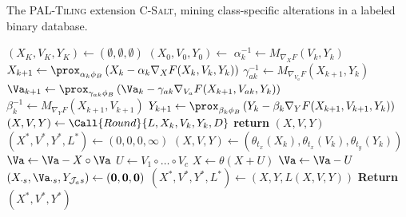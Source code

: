 \begin{algorithm}[t]
\caption{The \textsc{PAL-Tiling} extension \textsc{C-Salt}, mining class-specific alterations in a labeled binary database.}
\begin{algorithmic}[1]
        \State $(X_K,V_K,Y_K)\gets (\emptyset, \emptyset, \emptyset)$
            \State $(X_0,V_0,Y_0) \gets $ 
            \label{alg:csalt:optStart} 
   	        \State $\alpha_k^{-1} \gets M_{\nabla_XF}(V_k,Y_k)$
            \State $X_{k+1} \gets \prox_{\alpha_k\phi_B}\left(X_k-\alpha_k\nabla_XF(X_k,V_k,Y_k)\right)$
            \State $\gamma_{ak}^{-1} \gets M_{\nabla_{V_a}F}(X_{k+1},Y_k)$  
            \State $\Va_{k+1} \gets \prox_{\gamma_{ak}\phi_B}\left(\Va_k-\gamma_{ak}\nabla_{V_a}F(X_{k+1},V_{ak},Y_k)\right)$  
            \State $\beta_k^{-1} \gets M_{\nabla_YF}(X_{k+1},V_{k+1})$
            \State $Y_{k+1} \gets \prox_{\beta_k\phi_B}\left(Y_k-\beta_k\nabla_YF(X_{k+1},V_{k+1},Y_k)\right)$
    \EndFor\label{alg:csalt:optEnd}
    \State $(X,V,Y)\gets \Call{Round}{L,X_k,V_k,Y_k,D}$
    	\textbf{return} $(X,V,Y)$
    \EndIIf\label{alg:csalt:rankgap}
    \EndFor
    \EndFunction
    \Statex ~
    \State $(X^*,V^*,Y^*,L^*)\gets (0,0,0,\infty)$
    \State $(X,V,Y)\gets (\theta_{t_x}(X_k),\theta_{t_x}(V_k),\theta_{t_y}(Y_k))$\label{alg:csalt:defV1}
    \State $\Va\gets \Va-X\circ \Va$
    \State $U\gets V_1\circ \ldots \circ V_c$
    \State $X\gets \theta(X+ U)$
    \State $\Va\gets \Va- U$\label{alg:csalt:defV2}
         $(X_{\cdot s},\Va_{\cdot s},Y_{\mathcal{J}_a s})\gets (\mathbf{0},\mathbf{0},\mathbf{0})$ \label{alg:csalt:toss}
        \EndIIf
    \EndFor
     $(X^*,V^*,Y^*,L^*)\gets (X,Y,L(X,V,Y))$ 
    \EndIIf
  \EndFor
  \State \textbf{Return} $(X^*,V^*,Y^*)$
  \EndFunction
\end{algorithmic}
\label{alg:C-Salt}
\end{algorithm}

